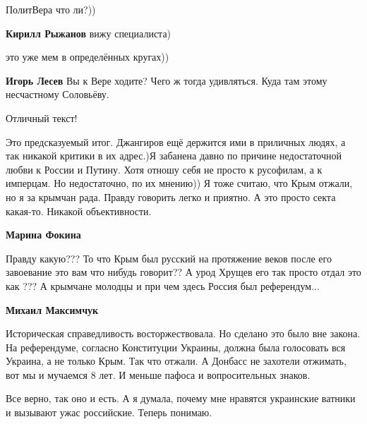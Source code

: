  
 
 
 
 
\zzSecCmt

\begin{itemize} %
ПолитВера что ли?))

\begin{itemize} %
\textbf{Кирилл Рыжанов} вижу специалиста)

это уже мем в определённых кругах))

\textbf{Игорь Лесев} Вы к Вере ходите? Чего ж тогда удивляться. Куда там этому несчастному Соловьёву.
\end{itemize} %

Отличный текст!


Это предсказуемый итог. Джангиров ещё держится ими в приличных людях, а так
никакой критики в их адрес.)Я забанена давно по причине недостаточной любви к
России и Путину. Хотя отношу себя не просто к русофилам, а к имперцам. Но
недостаточно, по их мнению)) Я тоже считаю, что Крым отжали, но я за крымчан рада.
Правду говорить легко и приятно. А это просто секта какая-то. Никакой
объективности.

\begin{itemize} %
\textbf{Марина Фокина} 

Правду какую??? То что Крым был русский на протяжение веков после его
завоевание это вам что нибудь говорит?? А урод Хрущев его так просто отдал это
как ??? А крымчане молодцы и при чем здесь Россия был референдум...


\textbf{Михаил Максимчук} 

Историческая справедливость восторжествовала. Но сделано это было вне закона.
На референдуме, согласно Конституции Украины, должна была голосовать вся
Украина, а не только Крым. Так что отжали. А Донбасс не захотели отжимать, вот мы
и мучаемся 8 лет. И меньше пафоса и вопросительных знаков.

\end{itemize} %

Все верно, так оно и есть. А я думала, почему мне нравятся украинские ватники и вызывают ужас российские. Теперь понимаю.


\end{itemize}
